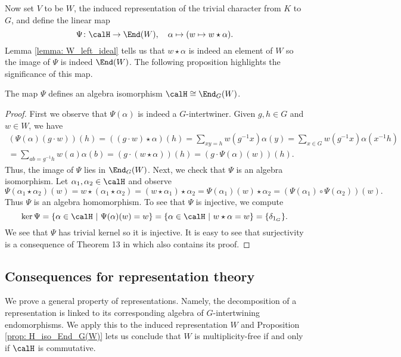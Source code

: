 Now set $V$ to be $W$, the induced representation of the trivial character from $K$ to $G$, and define the linear map
\[
	\Psi\colon \calH\to\End(W),\quad \alpha\mapsto(w\mapsto w\star\alpha).
\]
Lemma \ref{lemma: W_left_ideal} tells us that $w \star\alpha$ is indeed an element of $W$ so the image of $\Psi$ is indeed $\End(W)$.
The following proposition highlights the significance of this map.
\begin{prop}\label{prop: H_iso_End_G(W)}
	The map $\Psi$ defines an algebra isomorphism $\calH \cong \End_G(W)$.
\end{prop}
\begin{proof}
	First we observe that $\Psi(\alpha)$ is indeed a $G$-intertwiner.
	Given $g,h\in G$ and $w\in W$, we have
	\begin{multline*}
		(\Psi(\alpha)(g\cdot w))(h) = ((g\cdot w)\star\alpha)(h) = \sum_{xy=h} w(g^{-1}x)\alpha(y) = \sum_{x\in G} w(g^{-1}x)\alpha(x^{-1}h) \\
		= \sum_{ab=g^{-1}h} w(a)\alpha(b) = (g\cdot(w\star\alpha))(h) = (g\cdot \Psi(\alpha)(w))(h).
	\end{multline*}
	Thus, the image of $\Psi$ lies in $\End_G(W)$.
	Next, we check that $\Psi$ is an algebra isomorphism.
	Let $\alpha_1,\alpha_2\in\calH$ and observe
	\[
		\Psi(\alpha_1\star\alpha_2)(w) = w\star(\alpha_1\star\alpha_2) = (w\star\alpha_1)\star\alpha_2 = \Psi(\alpha_1)(w)\star\alpha_2 = (\Psi(\alpha_1)\circ\Psi(\alpha_2))(w).
	\]
	Thus $\Psi$ is an algebra homomorphism.
	To see that $\Psi$ is injective, we compute
	\[
		\ker \Psi = \{\alpha\in\calH\ |\ \Psi(\alpha)(w) = w\} = \{\alpha\in\calH\ |\ w\star\alpha = w\} = \{\delta_{1_G}\}.
	\]
	We see that $\Psi$ has trivial kernel so it is injective.
	It is easy to see that surjectivity is a consequence of Theorem 13 in \cite{Murnaghan05} which also contains its proof.
\end{proof}


\subsection{Consequences for representation theory}\label{Section1.6}
We prove a general property of representations.
Namely, the decomposition of a representation is linked to its corresponding algebra of $G$-intertwining endomorphisms.
We apply this to the induced representation $W$ and Proposition \ref{prop: H_iso_End_G(W)} lets us conclude that $W$ is multiplicity-free if and only if $\calH$ is commutative.

